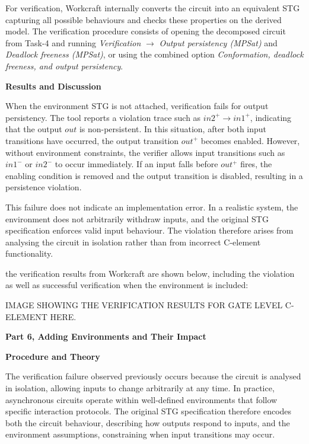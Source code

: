 \documentclass[a4paper,12pt]{article}
\begin{document}
For verification, Workcraft internally converts the circuit into an equivalent STG capturing all possible behaviours and checks these properties on the derived model. The verification procedure consists of opening the decomposed circuit from Task-4 and running \textit{Verification} $\rightarrow$ \textit{Output persistency (MPSat)} and \textit{Deadlock freeness (MPSat)}, or using the combined option \textit{Conformation, deadlock freeness, and output persistency}.

\textbf{Results and Discussion}

When the environment STG is not attached, verification fails for output persistency. The tool reports a violation trace such as $in2^+ \rightarrow in1^+$, indicating that the output $out$ is non-persistent. In this situation, after both input transitions have occurred, the output transition $out^+$ becomes enabled. However, without environment constraints, the verifier allows input transitions such as $in1^-$ or $in2^-$ to occur immediately. If an input falls before $out^+$ fires, the enabling condition is removed and the output transition is disabled, resulting in a persistence violation.

This failure does not indicate an implementation error. In a realistic system, the environment does not arbitrarily withdraw inputs, and the original STG specification enforces valid input behaviour. The violation therefore arises from analysing the circuit in isolation rather than from incorrect C-element functionality.

the verification results from Workcraft are shown below, including the violation as well as successful verification when the environment is included:

\begin{large}
    IMAGE SHOWING THE VERIFICATION RESULTS FOR GATE LEVEL C-ELEMENT HERE.
\end{large}

\textbf{Part 6, Adding Environments and Their Impact}

\textbf{Procedure and Theory}

The verification failure observed previously occurs because the circuit is analysed in isolation, allowing inputs to change arbitrarily at any time. In practice, asynchronous circuits operate within well-defined environments that follow specific interaction protocols. The original STG specification therefore encodes both the circuit behaviour, describing how outputs respond to inputs, and the environment assumptions, constraining when input transitions may occur.
\end{document}
